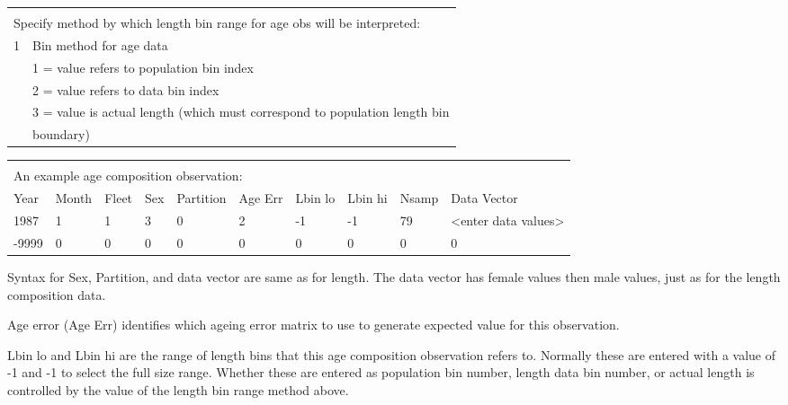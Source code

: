 \begin{tabular}{p{1cm} p{14cm}}
	 & \\
	\multicolumn{2}{l}{Specify method by which length bin range for age obs will be interpreted:} \\
	\hline
	1 & Bin method for age data \Tstrut\\
	  & 1 = value refers to population bin index \\
	  & 2 = value refers to data bin index \\
	  & 3 = value is actual length (which must correspond to population length bin \\
	  & boundary) \Bstrut\\
	 \hline
\end{tabular}
\leavevmode\tagmcend\tagstructend\par

\begin{tabular}{p{1cm} p{1cm} p{1cm} p{1cm} p{1.5cm} p{1cm} p{1cm} p{1cm} p{1cm} p{2.5cm}}
	\multicolumn{10}{l}{} \\
	\multicolumn{10}{l}{An example age composition observation:} \\
	\hline
	Year & Month & Fleet & Sex & Partition & Age Err & Lbin lo & Lbin hi & Nsamp & Data Vector \Tstrut\\
	\hline
	1987 & 1 & 1 & 3 & 0 & 2 & -1 & -1 & 79 & <enter data values> \Tstrut\\
	-9999 & 0 & 0 & 0 & 0 & 0 & 0 & 0 & 0 & 0 \Bstrut\\
	\hline
\end{tabular}
\leavevmode\tagmcend\tagstructend\par

Syntax for Sex, Partition, and data vector are same as for length. The data vector has female values then male values, just as for the length composition data.


Age error (Age Err) identifies which ageing error matrix to use to generate expected value for this observation.

Lbin lo and Lbin hi are the range of length bins that this age composition observation refers to. Normally these are entered with a value of -1 and -1 to select the full size range. Whether these are entered as population bin number, length data bin number, or actual length is controlled by the value of the length bin range method above.

